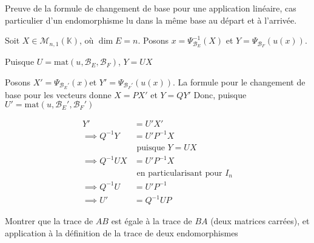 \documentclass{article}
\begin{document}
\begin{question_kholle}[
	Soient $(E, F)$ deux $\mathbb{K}$-espaces vectoriels de dimension finie, $u \in \mathcal{L}_{\mathbb{K}}(E, F)$, $\mathcal{B}_{E}$ et $\mathcal{B}_{E}'$ deux bases de $E$, $\mathcal{B}_{F}$ et $\mathcal{B}_{F}'$ deux bases de $F$

Posons $U = \mathrm{mat}(u, \mathcal{B}_{E}, \mathcal{B}_{F})$ et $U' = \mathrm{mat}(u, \mathcal{B}_{E}', \mathcal{B}_{F}')$, $P = \mathcal{P}(\mathcal{B}_{E} \to \mathcal{B}_{E}')$, et $Q = \mathcal{P}(\mathcal{B}_{F} \to \mathcal{B}_{F}')$

Alors 
$$
U' = Q^{-1} U P
$$
]{Preuve de la formule de changement de base pour une application linéaire, cas particulier d'un endomorphisme lu dans la même base au départ et à l'arrivée.}
	

Soit $X \in \mathcal{M}_{n, 1}(\mathbb{K})$, où $\dim E = n$.
Posons $x = \Psi_{\mathcal{B}_{E}}^{-1}(X)$ et $Y = \Psi_{\mathcal{B}_{F}}(u(x))$.

Puisque $U = \mathrm{mat}(u, \mathcal{B}_{E}, \mathcal{B}_{F})$, $Y = UX$

Posons $X' = \Psi_{\mathcal{B}_{E}'}(x)$et $Y' = \Psi_{\mathcal{B}_{F}'}(u(x))$.
La formule pour le changement de base pour les vecteurs donne $X = PX'$ et $Y =QY'$
Donc, puisque $U' = \mathrm{mat}(u, \mathcal{B}_{E}', \mathcal{B}_{F}')$

\begin{align*}
Y'  & = U' X' \\
\implies Q^{-1}Y  & = U' P^{-1} X \\ 
&\text{ puisque }Y=UX\\
\implies Q^{-1}U X  & = U' P^{-1}X  \\
&\text{ en particularisant pour }I_{n}\\
\implies Q^{-1}U &= U' P^{-1} \\
\implies U' &= Q^{-1}UP
\end{align*}

\end{question_kholle}
\begin{question_kholle}{Montrer que la trace de $AB$ est égale à la trace de $BA$ (deux matrices carrées), et application à la définition de la trace de deux endomorphismes}
	
\end{question_kholle}
\end{document}
